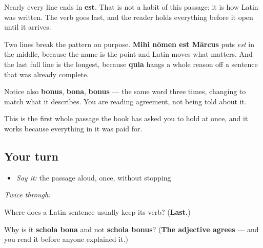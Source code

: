 \begin{cousinweb}
Nearly every line ends in \textbf{est}. That is not a habit of this passage; it is how Latin was written. The verb goes last, and the reader holds everything before it open until it arrives.

Two lines break the pattern on purpose. \textbf{Mihi nōmen est Mārcus} puts \emph{est} in the middle, because the name is the point and Latin moves what matters. And the last full line is the longest, because \textbf{quia} hangs a whole reason off a sentence that was already complete.

Notice also \textbf{bonus}, \textbf{bona}, \textbf{bonus} — the same word three times, changing to match what it describes. You are reading agreement, not being told about it.

This is the first whole passage the book has asked you to hold at once, and it works because everything in it was paid for.
\end{cousinweb}

\subsection*{Your turn}
\begin{itemize}
\raggedright
  \item \emph{Say it:} the passage aloud, once, without stopping
\end{itemize}

\emph{Twice through:}

\begin{tcolorbox}[breakable,colback=teal!4,colframe=teal!35!black,title={Before you move on}]
Where does a Latin sentence usually keep its verb? (\textbf{Last.})

Why is it \textbf{schola bona} and not \textbf{schola bonus}? (\textbf{The adjective agrees} — and you read it before anyone explained it.)
\end{tcolorbox}
